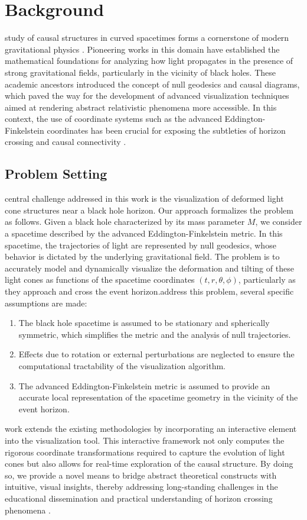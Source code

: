 \documentclass{article}
\begin{document}
\section{Background}\n\nThe study of causal structures in curved spacetimes forms a cornerstone of modern gravitational physics \cite{Reference1,Reference2}. Pioneering works in this domain have established the mathematical foundations for analyzing how light propagates in the presence of strong gravitational fields, particularly in the vicinity of black holes. These academic ancestors introduced the concept of null geodesics and causal diagrams, which paved the way for the development of advanced visualization techniques aimed at rendering abstract relativistic phenomena more accessible. In this context, the use of coordinate systems such as the advanced Eddington-Finkelstein coordinates has been crucial for exposing the subtleties of horizon crossing and causal connectivity \cite{Reference3}.\n\n\subsection{Problem Setting}\n\nThe central challenge addressed in this work is the visualization of deformed light cone structures near a black hole horizon. Our approach formalizes the problem as follows. Given a black hole characterized by its mass parameter $M$, we consider a spacetime described by the advanced Eddington-Finkelstein metric. In this spacetime, the trajectories of light are represented by null geodesics, whose behavior is dictated by the underlying gravitational field. The problem is to accurately model and dynamically visualize the deformation and tilting of these light cones as functions of the spacetime coordinates $(t, r, \theta, \phi)$, particularly as they approach and cross the event horizon.\n\nTo address this problem, several specific assumptions are made:\n\begin{enumerate}\n  \item The black hole spacetime is assumed to be stationary and spherically symmetric, which simplifies the metric and the analysis of null trajectories.\n  \item Effects due to rotation or external perturbations are neglected to ensure the computational tractability of the visualization algorithm.\n  \item The advanced Eddington-Finkelstein metric is assumed to provide an accurate local representation of the spacetime geometry in the vicinity of the event horizon.\n\end{enumerate}\n\nOur work extends the existing methodologies by incorporating an interactive element into the visualization tool. This interactive framework not only computes the rigorous coordinate transformations required to capture the evolution of light cones but also allows for real-time exploration of the causal structure. By doing so, we provide a novel means to bridge abstract theoretical constructs with intuitive, visual insights, thereby addressing long-standing challenges in the educational dissemination and practical understanding of horizon crossing phenomena \cite{Reference4}.
\end{document}
